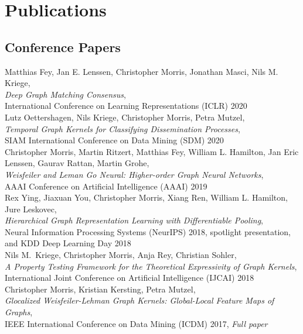 \documentclass[11pt, a4paper]{scrartcl}
\newcommand{\years}[1]{\marginnote {\textbf{#1}}}
\begin{document}
\section*{Publications}

\subsection*{Conference Papers}

\years{2020} Matthias Fey, Jan E. Lenssen, Christopher Morris, Jonathan Masci, Nils M. Kriege,  \\
\emph{Deep Graph Matching Consensus},\\
International Conference on Learning Representations (ICLR) 2020\\

Lutz Oettershagen, Nils Kriege, Christopher Morris, Petra Mutzel,  \\
\emph{Temporal Graph Kernels for Classifying Dissemination Processes},\\
SIAM International Conference on Data Mining (SDM) 2020\\


\years{2019}Christopher Morris, Martin Ritzert, Matthias Fey, William L. Hamilton, Jan Eric Lenssen, Gaurav Rattan, Martin Grohe,  \\
\emph{Weisfeiler and Leman Go Neural: Higher-order Graph Neural Networks},\\
AAAI Conference on Artificial Intelligence (AAAI) 2019 \\

\years{2018} Rex Ying, Jiaxuan You, Christopher Morris, Xiang Ren, William L. Hamilton, Jure Leskovec, \\
\emph{Hierarchical Graph Representation Learning with Differentiable Pooling},\\
 Neural Information Processing Systems (NeurIPS) 2018, spotlight presentation, and KDD Deep Learning Day 2018 \\

Nils M.~Kriege, Christopher Morris, Anja Rey, Christian Sohler,\\
\emph{A Property Testing Framework for the Theoretical Expressivity of Graph Kernels},\\
International Joint Conference on Artificial Intelligence (IJCAI) 2018\\

\years{2017} Christopher Morris, Kristian Kersting, Petra Mutzel,\\
\emph{Glocalized Weisfeiler-Lehman Graph Kernels: Global-Local Feature Maps of Graphs},\\
IEEE International Conference on Data Mining (ICDM) 2017, \emph{Full paper}\\
\end{document}

